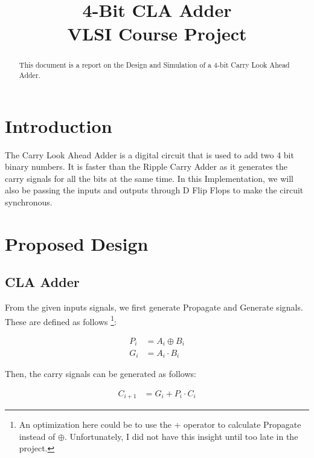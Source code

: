 \documentclass[conference]{IEEEtran}
\begin{document}
\title{4-Bit CLA Adder \\ VLSI Course Project}

\author{
}

\maketitle

\begin{abstract}
This document is a report on the Design and Simulation of a 4-bit Carry Look Ahead Adder.
\end{abstract}


\section{Introduction}
The Carry Look Ahead Adder is a digital circuit that is used to add two 4 bit binary numbers. It is faster than the Ripple Carry Adder as it generates the carry signals for all the bits at the same time. In this Implementation, we will also be passing the inputs and outputs through D Flip Flops to make the circuit synchronous.

\section{Proposed Design}

\subsection{CLA Adder} 
\cite{b1} From the given inputs signals, we first generate Propagate and Generate signals. These are defined as follows \footnote{An optimization here could be to use the + operator to calculate Propagate instead of $\oplus$. Unfortunately, I did not have this insight until too late in the project.}:

\begin{align}
    P_i &= A_i \oplus B_i \\
    G_i &= A_i \cdot B_i
\end{align}

Then, the carry signals can be generated as follows:

\begin{align}
    C_{i+1} &= G_i + P_i \cdot C_i
\end{align}
\end{document}
